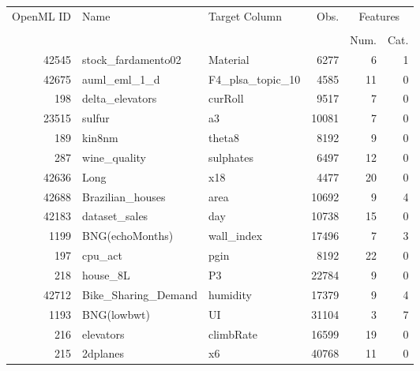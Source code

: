 \begin{table}[h!]
\centering
\begin{tabular}{rllrrr}
\toprule
\multirow{2}{*}{OpenML ID} & \multirow{2}{*}{Name} &\multirow{2}{*}{Target Column} & \multirow{2}{*}{Obs.} & \multicolumn{2}{c}{Features} \\ \cline{5-6}
\\[-0.75em]
&                     &  &                            & Num.    & Cat.   \\
\midrule
     42545 &  stock\_fardamento02 &  Material &        6277 &                6 &                1 \\
     42675 &        auml\_eml\_1\_d &   F4\_plsa\_topic\_10 &      4585 &               11 &                0 \\
       198 &     delta\_elevators &   curRoll &      9517 &                7 &                0 \\
     23515 &              sulfur &     a3 &   10081 &                7 &                0 \\
       189 &              kin8nm &     theta8 &    8192 &                9 &                0 \\
       287 &        wine\_quality &    sulphates &     6497 &               12 &                0 \\
     42636 &                Long &     x18 &    4477 &               20 &                0 \\
     42688 &    Brazilian\_houses &   area &     10692 &                9 &                4 \\
     42183 &       dataset\_sales &   day &     10738 &               15 &                0 \\
      1199 &     BNG(echoMonths) &   wall\_index &     17496 &                7 &                3 \\
       197 &             cpu\_act &    pgin &     8192 &               22 &                0 \\
       218 &            house\_8L &    P3 &    22784 &                9 &                0 \\
     42712 & Bike\_Sharing\_Demand &   humidity &     17379 &                9 &                4 \\
      1193 &         BNG(lowbwt) &    UI &    31104 &                3 &                7 \\
       216 &           elevators &    climbRate &    16599 &               19 &                0 \\
       215 &            2dplanes &    x6 &    40768 &               11 &                0 \\

\end{tabular}
\end{table}
